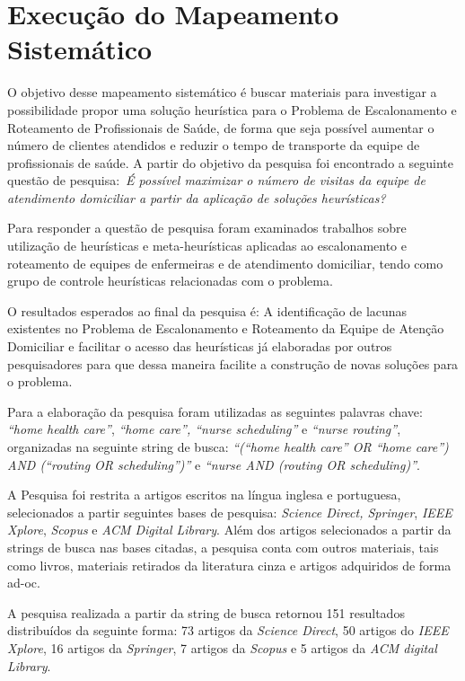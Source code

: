 \section{Execução do Mapeamento Sistemático}

O objetivo desse mapeamento sistemático é buscar materiais para investigar a possibilidade propor uma solução heurística para o Problema de Escalonamento e Roteamento de Profissionais de Saúde, de forma que seja possível aumentar  o número de clientes atendidos e reduzir o tempo de transporte da equipe de profissionais de saúde. 
A partir do objetivo da pesquisa foi encontrado a seguinte questão de pesquisa:~\emph{É possível maximizar o número de visitas da equipe de atendimento domiciliar a partir da aplicação de soluções heurísticas?}

Para responder a questão de pesquisa foram examinados trabalhos sobre utilização de heurísticas e meta-heurísticas aplicadas ao escalonamento e roteamento  de equipes de enfermeiras e de atendimento domiciliar, tendo como grupo de controle heurísticas relacionadas com o problema.

O resultados esperados ao final da pesquisa é: A identificação de lacunas existentes no Problema de Escalonamento e Roteamento da Equipe de Atenção Domiciliar e facilitar o acesso das heurísticas já elaboradas por outros pesquisadores para que dessa maneira facilite a construção de novas soluções para o problema.

Para a elaboração da pesquisa foram utilizadas as seguintes palavras chave: \textit{``home health care''}, \textit{``home care'', ``nurse scheduling''} e \textit{``nurse routing''}, organizadas na seguinte string de busca: \textit{``(``home health care'' OR ``home care'') AND (``routing OR scheduling'')''} e \textit{``nurse AND (routing OR scheduling)''}. 

A Pesquisa foi restrita a artigos escritos na língua inglesa e portuguesa, selecionados a partir seguintes bases de pesquisa: \textit{Science Direct, Springer}, \textit{IEEE Xplore}, \textit{Scopus} e \textit{ACM Digital Library}. Além dos artigos selecionados a partir da strings de busca nas bases citadas, a pesquisa conta com outros materiais, tais como livros, materiais retirados da literatura cinza e artigos adquiridos de forma ad-oc.

A pesquisa realizada a partir da string de busca retornou 151 resultados distribuídos da seguinte forma: 73 artigos da \textit{Science Direct}, 50 artigos do \textit{IEEE Xplore}, 16 artigos da \textit{Springer}, 7 artigos da \textit{Scopus} e 5 artigos da \textit{ACM digital Library}.%

